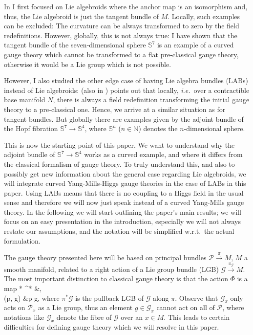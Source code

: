 \documentclass[a4paper,oneside,11pt,bibliography=totoc]{scrartcl}
\def\bas#1\eas{\begin{align*}#1\end{align*}}
\theoremstyle{plain}
\theoremstyle{remark}
\theoremstyle{definition}
\begin{document}
In \cite{MyThesis} I first focused on Lie algebroids where the anchor map is an isomorphism and, thus, the Lie algebroid is just the tangent bundle of $M$. Locally, such examples can be excluded: The curvature can be always transformed to zero by the field redefinitions. However, globally, this is not always true: I have shown that the tangent bundle of the seven-dimensional sphere $\mathds{S}^7$ is an example of a curved gauge theory which cannot be transformed to a flat pre-classical gauge theory, otherwise it would be a Lie group which is not possible.

However, I also studied the other edge case of having Lie algebra bundles (LABs) instead of Lie algebroids: \cite{MyThesis} (also in \cite{My1stpaper}) points out that locally, \textit{i.e.}~over a contractible base manifold $N$, there is always a field redefinition transforming the initial gauge theory to a pre-classical one. Hence, we arrive at a similar situation as for tangent bundles. But globally there are examples given by the adjoint bundle of the Hopf fibration $\mathds{S}^7 \to \mathds{S}^4$, where $\mathds{S}^n$ ($n \in \mathbb{N}$) denotes the $n$-dimensional sphere.

This is now the starting point of this paper. We want to understand why the adjoint bundle of $\mathds{S}^7 \to \mathds{S}^4$ works as a curved example, and where it differs from the classical formalism of gauge theory. To truly understand this, and also to possibly get new information about the general case regarding Lie algebroids, we will integrate curved Yang-Mills-Higgs gauge theories in the case of LABs in this paper. Using LABs means that there is no coupling to a Higgs field in the usual sense and therefore we will now just speak instead of a curved Yang-Mills gauge theory. In the following we will start outlining the paper's main results; we will focus on an easy presentation in the introduction, especially we will not always restate our assumptions, and the notation will be simplified w.r.t.\ the actual formulation.

The gauge theory presented here will be based on principal bundles $\mathcal{P} \stackrel{\pi}{\to} M$, $M$ a smooth manifold, related to a right action of a Lie group bundle (LGB) $\mathcal{G} \stackrel{\pi_{\mathcal{G}}}{\to} M$. The most important distinction to classical gauge theory is that the action $\Phi$ is a map
\bas
\mathcal{P} *  \coloneqq \pi^* &\to {},\\
(p, g) &\mapsto p \cdot g,
\eas
where $\pi^*\mathcal{G}$ is the pullback LGB of $\mathcal{G}$ along $\pi$. Observe that $\mathcal{G}_x$ only acts on $\mathcal{P}_x$ as a Lie group, thus an element $g \in \mathcal{G}_x$ cannot act on all of $\mathcal{P}$, where notations like $\mathcal{G}_x$ denote the fibre of $\mathcal{G}$ over an $x \in M$. This leads to certain difficulties for defining gauge theory which we will resolve in this paper.
\end{document}
